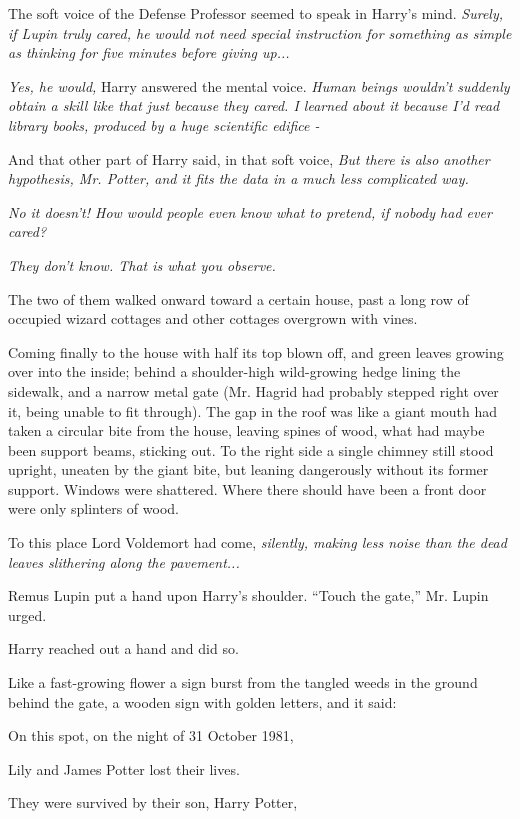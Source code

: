 The soft voice of the Defense Professor seemed to speak in Harry's mind. \emph{Surely, if Lupin truly cared, he would not need special instruction for something as simple as thinking for five minutes before giving up...}

\emph{Yes, he would,} Harry answered the mental voice. \emph{Human beings wouldn't suddenly obtain a skill like that just because they cared. I learned about it because I'd read library books, produced by a huge scientific edifice -}

And that other part of Harry said, in that soft voice, \emph{But there is also another hypothesis, Mr. Potter, and it fits the data in a much less complicated way.}

\emph{No it doesn't! How would people even know what to pretend, if nobody had ever cared?}

\emph{They don't know. That is what you observe.}

The two of them walked onward toward a certain house, past a long row of occupied wizard cottages and other cottages overgrown with vines.

Coming finally to the house with half its top blown off, and green leaves growing over into the inside; behind a shoulder-high wild-growing hedge lining the sidewalk, and a narrow metal gate (Mr. Hagrid had probably stepped right over it, being unable to fit through). The gap in the roof was like a giant mouth had taken a circular bite from the house, leaving spines of wood, what had maybe been support beams, sticking out. To the right side a single chimney still stood upright, uneaten by the giant bite, but leaning dangerously without its former support. Windows were shattered. Where there should have been a front door were only splinters of wood.

To this place Lord Voldemort had come, \emph{silently, making less noise than the dead leaves slithering along the pavement...}

Remus Lupin put a hand upon Harry's shoulder. ``Touch the gate,'' Mr. Lupin urged.

Harry reached out a hand and did so.

Like a fast-growing flower a sign burst from the tangled weeds in the ground behind the gate, a wooden sign with golden letters, and it said:

On this spot, on the night of 31 October 1981,

Lily and James Potter lost their lives.

They were survived by their son, Harry Potter,

